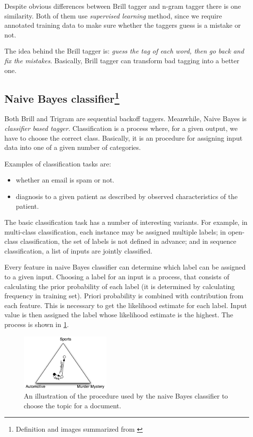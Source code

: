 \documentclass[10pt, conference, compsocconf]{IEEEtran}
\begin{document}
Despite obvious differences between Brill tagger and n-gram tagger there is one similarity. Both of them use \textit{supervised learning} method, since we require annotated training data to make sure whether the taggers guess is a mistake or not.

The idea behind the Brill tagger is: \textit{guess the tag of each word, then go back and fix the mistakes}. Basically, Brill tagger can transform bad tagging into a better one. 

\subsection[Naive Bayes classifier]{Naive Bayes classifier\footnote{Definition and images summarized from \cite{NLTKBOOK}}}
Both Brill and Trigram are sequential backoff taggers. Meanwhile, Naive Bayes is \textit{classifier based tagger}.
Classification is a process where, for a given output, we have to choose the correct class. Basically, it is an  procedure for assigning input data into one of a given number of categories.

Examples of classification tasks are:
\begin{itemize}
\item whether an email is spam or not.
\item diagnosis to a given patient as described by observed characteristics of the patient.
\end{itemize}
The basic classification task has a number of interesting variants. For example, in multi-class classification, each instance may be assigned multiple labels; in open-class classification, the set of labels is not defined in advance; and in sequence classification, a list of inputs are jointly classified.

Every feature in naive Bayes classifier can determine which label can be assigned to a given input. Choosing a label for an input is a process, that consists of calculating the prior probability of each label (it is determined by calculating frequency in training set). Priori probability is combined with contribution from each feature. This is necessary to get the likelihood estimate for each label. Input value is then assigned the label whose likelihood estimate is the highest. The process is shown in \ref{fig:naive-bayes-triangle}.

\begin{figure}[htb]
\begin{center}
\includegraphics[width=0.4\textwidth]{naive-bayes-triangle.png} 
\end{center}
\caption{An illustration of the procedure used by the naive Bayes classifier to choose the topic for a document.}
\label{fig:naive-bayes-triangle}
\end{figure}
\end{document}
